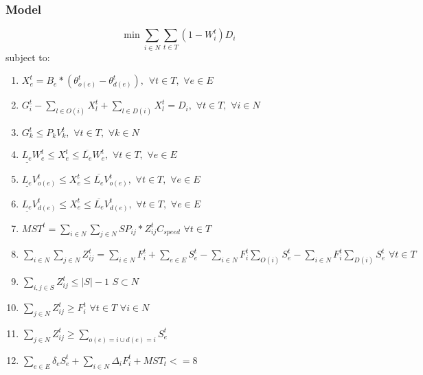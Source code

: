 \documentclass{article}
\begin{document}
	\subsubsection{Model}
	$$	\min \sum_{i \in N} \sum_{t \in T} (1-W_i^t)D_i $$
	subject to:
	\begin{enumerate}[label=(\arabic*), leftmargin=*, itemsep=0.4ex, before={\everymath{\displaystyle}}]%
		
		\item $ X_e^t = B_e * (\theta_{o(e)}^t - \theta_{d(e)}^t), \hspace{5pt} \forall t \in T, \hspace{4pt} \forall e \in E$
		\item $ G_i^t - \sum_{l \in O(i)} X_l^t + \sum_{l \in D(i)} X_l^t = D_i, \hspace{4pt} \forall t \in T, \hspace{4pt} \forall i \in N$
		\item $G_k^t \leq P_{k} V_{k}^t, \hspace{4pt} \forall t \in T, \hspace{4pt} \forall k \in N$
		\item $\underline{L_e}W_{e}^t \leq X_{e}^t \leq \overline{L_e}W_{e}^t, \hspace{4pt} \forall t \in T, \hspace{4pt} \forall e \in E$
		\item $\underline{L_e}V_{o(e)}^t \leq X_{e}^t \leq \overline{L_e}V_{o(e)}^t, \hspace{4pt} \forall t \in T, \hspace{4pt} \forall e \in E$
		\item $\underline{L_e}V_{d(e)}^t \leq X_{e}^t \leq \overline{L_e}V_{d(e)}^t, \hspace{4pt} \forall t \in T, \hspace{4pt} \forall e \in E$
		\item $MST^t = \sum_{i \in N} \sum_{j \in N} SP_{ij}*Z_{ij}^{t} C_{speed}\hspace{4pt} \forall t \in T $
		\item $\sum_{i \in N} \sum_{j \in N} Z_{ij}^{t} = \sum_{i \in N} F_i^t + \sum_{e \in E} S_e^t - \sum_{i \in N} F_i^t \sum_{O(i)} S_e^t - \sum_{i \in N} F_i^t \sum_{D(i)} S_e^t \hspace{4pt} \forall t \in T$
		\item $\sum_{i,j \in S} Z_{ij}^t \leq |S|-1 \hspace{4pt} S\subset N$
		\item $ \sum_{j \in N} Z_{ij}^t \geq F_i^t \hspace{4pt} \forall t \in T\hspace{4pt} \forall i \in N $
		\item $ \sum_{j \in N} Z_{ij}^t \geq \sum_{o(e) = i \cup d(e) = i} S_e^t$
		\item $ \sum_{e \in E} \delta_{e}S_e^t + \sum_{i \in N}\Delta_{i}F_i^t + MST_t <=8$
		

\end{enumerate}
\end{document}
